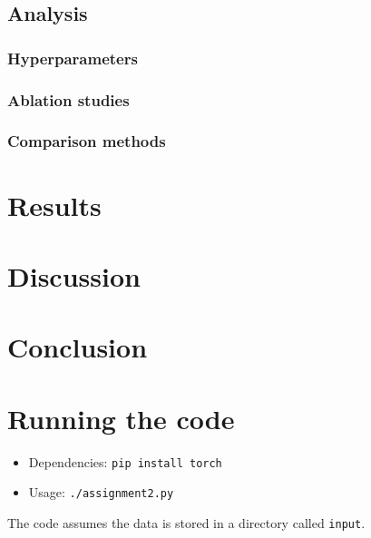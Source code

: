 \documentclass[landscape,twocolumn]{article}
\begin{document}
\subsection{Analysis}
\subsubsection{Hyperparameters}
\subsubsection{Ablation studies}
\subsubsection{Comparison methods}

\section{Results}

\section{Discussion}

\section{Conclusion}

\printbibliography\appendix
\section{Running the code}
\begin{itemize}
\item Dependencies: \texttt{pip install torch}
\item Usage: \texttt{./assignment2.py}
\end{itemize}
The code assumes the data is stored in a directory called \texttt{input}.
\end{document}
